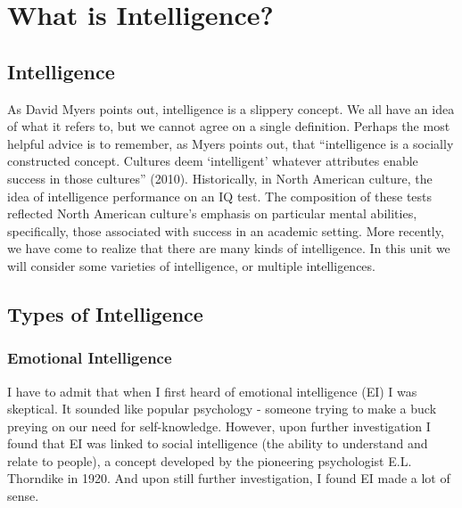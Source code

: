 \documentclass[
]{book}
\begin{document}
\hypertarget{what-is-intelligence}{%
\section{What is Intelligence?}\label{what-is-intelligence}}

\hypertarget{intelligence}{%
\subsection*{Intelligence}\label{intelligence}}

As David Myers points out, intelligence is a slippery concept. We all have an idea of what it refers to, but we cannot agree on a single definition. Perhaps the most helpful advice is to remember, as Myers points out, that ``intelligence is a socially constructed concept. Cultures deem `intelligent' whatever attributes enable success in those cultures'' (2010). Historically, in North American culture, the idea of intelligence performance on an IQ test. The composition of these tests reflected North American culture's emphasis on particular mental abilities, specifically, those associated with success in an academic setting. More recently, we have come to realize that there are many kinds of intelligence. In this unit we will consider some varieties of intelligence, or multiple intelligences.

\hypertarget{types-of-intelligence}{%
\subsection*{Types of Intelligence}\label{types-of-intelligence}}

\hypertarget{emotional-intelligence}{%
\subsubsection*{Emotional Intelligence}\label{emotional-intelligence}}

I have to admit that when I first heard of emotional intelligence (EI) I was skeptical. It sounded like popular psychology - someone trying to make a buck preying on our need for self-knowledge. However, upon further investigation I found that EI was linked to social intelligence (the ability to understand and relate to people), a concept developed by the pioneering psychologist E.L. Thorndike in 1920. And upon still further investigation, I found EI made a lot of sense.
\end{document}
